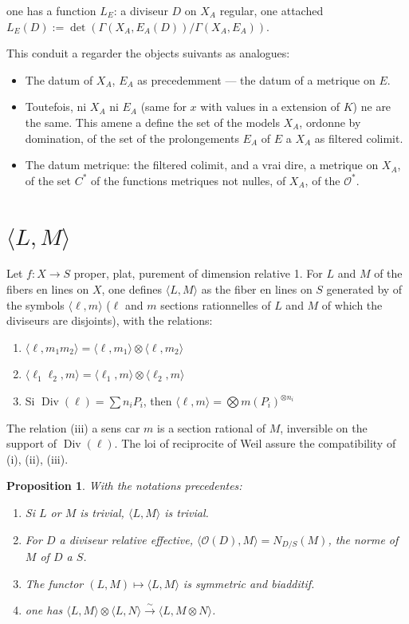 \documentclass[11pt,a4paper]{article}
\theoremstyle{plain}
\newtheorem{proposition}[theorem]{Proposition}
\theoremstyle{definition}
\DeclareMathOperator{\Div}{Div}
\newcommand{\cO}{\mathcal{O}}
\begin{document}
one has a function $L_E$: a diviseur $D$ on $X_A$ regular, one attached $L_E(D) := \det(\Gamma(X_A, E_A(D))/\Gamma(X_A, E_A))$.

This conduit a regarder the objects suivants as analogues:
\begin{itemize}
\item[(a)] The datum of $X_A$, $E_A$ as precedemment --- the datum of a metrique on $E$.
\item[(b)] Toutefois, ni $X_A$ ni $E_A$ (same for $x$ with values in a extension of $K$) ne are the same. This amene a define the set of the models $X_A$, ordonne by domination, of the set of the prolongements $E_A$ of $E$ a $X_A$ as filtered colimit.
\item[(c)] The datum metrique: the filtered colimit, and a vrai dire, a metrique on $X_A$, of the set $C^*$ of the functions metriques not nulles, of $X_A$, of the $\cO^*$.
\end{itemize}

\section{$\langle L, M \rangle$}

Let $f: X \to S$ proper, plat, purement of dimension relative 1. For $L$ and $M$ of the fibers en lines on $X$, one defines $\langle L, M \rangle$ as the fiber en lines on $S$ generated by of the symbols $\langle \ell, m \rangle$ ($\ell$ and $m$ sections rationnelles of $L$ and $M$ of which the diviseurs are disjoints), with the relations:
\begin{enumerate}
\item[(i)] $\langle \ell, m_1 m_2 \rangle = \langle \ell, m_1 \rangle \otimes \langle \ell, m_2 \rangle$
\item[(ii)] $\langle \ell_1 \ell_2, m \rangle = \langle \ell_1, m \rangle \otimes \langle \ell_2, m \rangle$
\item[(iii)] Si $\Div(\ell) = \sum n_i P_i$, then $\langle \ell, m \rangle = \bigotimes m(P_i)^{\otimes n_i}$
\end{enumerate}

The relation (iii) a sens car $m$ is a section rational of $M$, inversible on the support of $\Div(\ell)$. The loi of reciprocite of Weil assure the compatibility of (i), (ii), (iii).

\begin{proposition}
With the notations precedentes:
\begin{enumerate}
\item[(i)] Si $L$ or $M$ is trivial, $\langle L, M \rangle$ is trivial.
\item[(ii)] For $D$ a diviseur relative effective, $\langle \cO(D), M \rangle = N_{D/S}(M)$, the norme of $M$ of $D$ a $S$.
\item[(iii)] The functor $(L, M) \mapsto \langle L, M \rangle$ is symmetric and biadditif.
\item[(iv)] one has $\langle L, M \rangle \otimes \langle L, N \rangle \xrightarrow{\sim} \langle L, M \otimes N \rangle$.
\end{enumerate}
\end{proposition}
\end{document}
